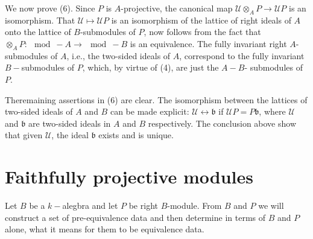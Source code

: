 We now prove (6). Since $P$ is $A$-projective, the canonical map
$\mathscr{U} \otimes_A P \to \mathscr{U}P$ is an isomorphism. That
$\mathscr{U} \mapsto \mathscr{U} P$ is an isomorphism of the lattice
of right ideals of $A$ onto the lattice of $B$-submodules of $P$, now
follows from the fact that $\otimes_A P : \mod- A \to \mod - B$ is an
equivalence. The fully invariant right $A$-submodules of $A$, i.e., the
two-sided ideals of $A$, correspond to the fully invariant
$B-$submodules of $P$, which, by virtue of (4), are just the $A - B$-
submodules of $P$. 

The\pageoriginale remaining assertions in (6) are clear. The
isomorphism between the 
lattices of two-sided ideals of $A$ and $B$ can be made explicit:
$\mathscr{U} \leftrightarrow \mathfrak{b}$ if $\mathscr{U} P =
P\mathfrak{b}$, where $\mathscr{U}$ and $\mathfrak{b}$ are two-sided
ideals in $A$ and $B$ respectively. The conclusion above show that
given $\mathscr{U}$, the ideal $\mathfrak{b}$ exists and is unique.  

\section{Faithfully projective modules}%

Let $B$ be a $k-$alegbra and let $P$ be right $B$-module. From $B$ and
$P$ we will construct a set of pre-equivalence data and then
determine in terms of $B$ and $P$ alone, what it means for them to be
equivalence data.  

